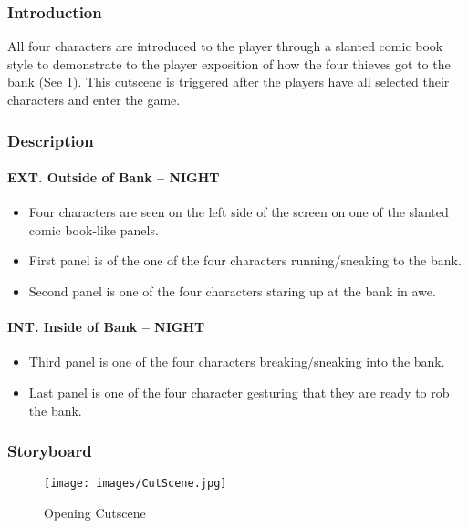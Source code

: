 \documentclass[10pt]{report}
\begin{document}
\subsubsection{Introduction}

All four characters are introduced to the player through a slanted comic book style to demonstrate to the player exposition of how the four thieves got to the bank (See \ref{fig:storyboard}). This cutscene is triggered after the players have all selected their characters and enter the game.

\subsubsection{Description}

\paragraph{EXT. Outside of Bank -- NIGHT} \mbox \\
\begin{itemize}
    \item Four characters are seen on the left side of the screen on one of the slanted comic book-like panels. 
    \item First panel is of the one of the four characters running/sneaking to the bank.
    \item Second panel is one of the four characters staring up at the bank in awe.
\end{itemize}
\paragraph{INT. Inside of Bank -- NIGHT} \mbox \\
\begin{itemize}
    \item Third panel is one of the four characters breaking/sneaking into the bank.
    \item Last panel is one of the four character gesturing that they are ready to rob the bank.
\end{itemize}

\subsubsection{Storyboard}

\begin{figure}[H]
    \centering
    \texttt{[image: images/CutScene.jpg]}
    \caption{Opening Cutscene}
    \label{fig:storyboard}
\end{figure}
\end{document}
